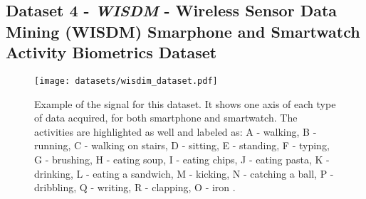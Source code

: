 %
    
\subsection{Dataset 4 - \textit{WISDM} - Wireless Sensor Data Mining (WISDM) Smarphone and Smartwatch Activity Biometrics Dataset}
\label{dat:dataset5}

\begin{figure}
\centering
\texttt{[image: datasets/wisdim\_dataset.pdf]}
\caption{Example of the signal for this dataset. It shows one axis of each type of data acquired, for both smartphone and smartwatch. The activities are highlighted as well and labeled as: A - walking, B - running, C - walking on stairs, D - sitting, E - standing, F -   typing, G - brushing, H - eating soup, I - eating chips, J - eating pasta, K - drinking, L - eating a sandwich, M - kicking, N - catching a ball, P - dribbling, Q - writing, R - clapping, O - iron \cite{dataset4}.}
\label{fig:wisdim_data}
\end{figure}

